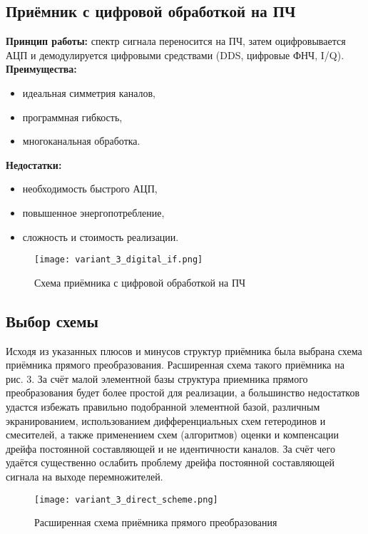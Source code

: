 \documentclass[a4paper,12pt]{article}
\begin{document}
\subsection{Приёмник с цифровой обработкой на ПЧ}
\textbf{Принцип работы:}\newline
спектр сигнала переносится на ПЧ, затем оцифровывается АЦП и демодулируется цифровыми средствами (DDS, цифровые ФНЧ, I/Q).
\newline
\newline
\textbf{Преимущества:}
\begin{itemize}
    \item идеальная симметрия каналов,
    \item программная гибкость,
    \item многоканальная обработка.
\end{itemize}
\textbf{Недостатки:}
\begin{itemize}
    \item необходимость быстрого АЦП,
    \item повышенное энергопотребление,
    \item сложность и стоимость реализации.
\end{itemize}
\begin{figure}[H]
    \centering
    \texttt{[image: variant\_3\_digital\_if.png]}
    \caption{Схема приёмника с цифровой обработкой на ПЧ}
    \label{fig:enter-label}
\end{figure}



\subsection{Выбор схемы}
Исходя из указанных плюсов и минусов структур приёмника была выбрана схема приёмника прямого преобразования. Расширенная схема такого приёмника на рис. 3. За счёт малой элементной базы структура приемника прямого преобразования будет более простой для реализации, а большинство недостатков удастся избежать правильно подобранной элементной базой, различным экранированием, использованием дифференциальных схем гетеродинов и смесителей, а также применением схем (алгоритмов) оценки и компенсации дрейфа постоянной составляющей и не идентичности каналов. За счёт чего удаётся существенно ослабить проблему дрейфа постоянной составляющей сигнала на выходе перемножителей. 

\begin{figure}[H]
    \centering
    \texttt{[image: variant\_3\_direct\_scheme.png]}
    \caption{Расширенная схема приёмника прямого преобразования}
    \label{fig:enter-label}
\end{figure}
\end{document}
